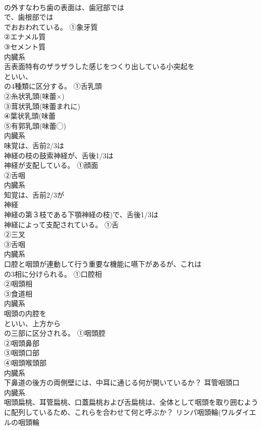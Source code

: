 \documentclass[8pt]{extreport}
\begin{document}
\begin{CJK}{UTF8}{min}
\\	の外すなわち歯の表面は、歯冠部では
\\	で、歯根部では
\\	でおおわれている。	①象牙質
\\	②エナメル質
\\	③セメント質
\\	内臓系
\\	舌表面特有のザラザラした感じをつくり出している小突起を
\\	といい、
\\	の4種類に区分する。	①舌乳頭
\\	②糸状乳頭(味蕾×)
\\	③茸状乳頭(味蕾まれに)
\\	④葉状乳頭(味蕾
\\	⑤有郭乳頭(味蕾◯)
\\	内臓系
\\	味覚は、舌前2/3は
\\	神経の枝の鼓索神経が、舌後1/3は
\\	神経が支配している。	①顔面
\\	②舌咽
\\	内臓系
\\	知覚は、舌前2/3が
\\	神経
\\	神経の第３枝である下顎神経の枝)で、舌後1/3は
\\	神経によって支配されている。	①舌
\\	②三叉
\\	③舌咽
\\	内臓系
\\	口腔と咽頭が連動して行う重要な機能に嚥下があるが、これは
\\	の3相に分けられる。	①口腔相
\\	②咽頭相
\\	③食道相
\\	内臓系
\\	咽頭の内腔を
\\	といい、上方から
\\	の三部に区分される。	①咽頭腔
\\	②咽頭鼻部
\\	③咽頭口部
\\	④咽頭喉頭部
\\	内臓系
\\	下鼻道の後方の両側壁には、中耳に通じる何が開いているか？	耳管咽頭口
\\	内臓系
\\	咽頭扁桃、耳管扁桃、口蓋扁桃および舌扁桃は、全体として咽頭を取り囲むように配列しているため、これらを合わせて何と呼ぶか？	リンパ咽頭輪(ワルダイエルの咽頭輪

\end{CJK}
\end{document}
